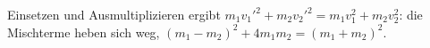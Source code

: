 Einsetzen und Ausmultiplizieren ergibt $m_1{v_1'}^2+m_2{v_2'}^2 = m_1v_1^2+m_2v_2^2$: die Mischterme heben sich weg, $(m_1-m_2)^2+4m_1m_2 = (m_1+m_2)^2$.
